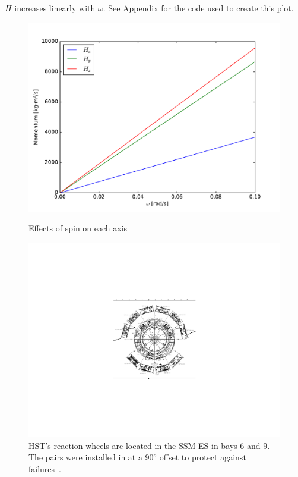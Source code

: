 \documentclass[onecolumn,10pt]{jhwhw}
\begin{document}
\clearpage
{}

$H$ increases linearly with $\omega$. See Appendix for the code used to create this plot.

\begin{figure}[h!]
\begin{center}
\includegraphics[height=0.5\textheight]{figure2.pdf}
\label{fig:on}
\end{center}
\caption{Effects of spin on each axis}
\end{figure}

\clearpage
{}

\begin{figure}[h!]
\begin{center}
\includegraphics[height=0.5\textheight]{hst_rw.pdf}
\end{center}
\caption{HST's reaction wheels are located in the SSM-ES in bays 6 and 9. The pairs were installed in at a 90$^o$ offset to protect against failures~\cite{hst}.}
\label{fig:rw}
\end{figure}
\end{document}
